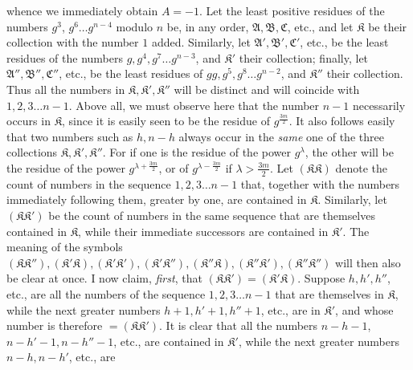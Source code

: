 whence we immediately obtain \(A=-1\). Let the least positive residues of the numbers \(g^3\), \(g^6\ldots g^{n-4}\) modulo \(n\) be, in any order, \(\mathfrak A,\allowbreak \mathfrak B,\allowbreak \mathfrak C\), etc., and let \(\mathfrak K\) be their collection with the number \(1\) added. Similarly, let \(\mathfrak A',\allowbreak \mathfrak B',\allowbreak \mathfrak C'\), etc., be the least residues of the numbers \(g,\allowbreak g^4,\allowbreak g^7\ldots g^{n-3}\), and \(\mathfrak K'\) their collection; finally, let \(\mathfrak A'',\allowbreak \mathfrak B'',\allowbreak \mathfrak C''\), etc., be the least residues of \(gg,\allowbreak g^5,\allowbreak g^8\ldots g^{n-2}\), and \(\mathfrak K''\) their collection. Thus all the numbers in \(\mathfrak K,\allowbreak \mathfrak K',\allowbreak \mathfrak K''\) will be distinct and will coincide with \(1,\allowbreak 2,\allowbreak 3\ldots n-1\). Above all, we must observe here that the number \(n-1\) necessarily occurs in \(\mathfrak K\), since it is easily seen to be the residue of \(g^{\frac{3m}{2}}\). It also follows easily that two numbers such as \(h,\allowbreak n-h\) always occur in the \textit{same} one of the three collections \(\mathfrak K,\allowbreak \mathfrak K',\allowbreak \mathfrak K''\). For if one is the residue of the power \(g^\lambda\), the other will be the residue of the power \(g^{\lambda+\frac{3m}{2}}\), or of \(g^{\lambda-\frac{3m}{2}}\) if \(\lambda>\frac{3m}{2}\). Let \((\mathfrak K\mathfrak K)\) denote the count of numbers in the sequence \(1,\allowbreak 2,\allowbreak 3\ldots n-1\) that, together with the numbers immediately following them, greater by one, are contained in \(\mathfrak K\). Similarly, let \((\mathfrak K\mathfrak K')\) be the count of numbers in the same sequence that are themselves contained in \(\mathfrak K\), while their immediate successors are contained in \(\mathfrak K'\). The meaning of the symbols \((\mathfrak K\mathfrak K''),\allowbreak (\mathfrak K'\mathfrak K),\allowbreak (\mathfrak K'\mathfrak K'),\allowbreak (\mathfrak K'\mathfrak K''),\allowbreak (\mathfrak K''\mathfrak K),\allowbreak (\mathfrak K''\mathfrak K'),\allowbreak (\mathfrak K''\mathfrak K'')\) will then also be clear at once. I now claim, \textit{first}, that \((\mathfrak K\mathfrak K')=(\mathfrak K'\mathfrak K)\). Suppose \(h,\allowbreak h',\allowbreak h''\), etc., are all the numbers of the sequence \(1,\allowbreak 2,\allowbreak 3\ldots n-1\) that are themselves in \(\mathfrak K\), while the next greater numbers \(h+1,\allowbreak h'+1,\allowbreak h''+1\), etc., are in \(\mathfrak K'\), and whose number is therefore \(=(\mathfrak K\mathfrak K')\). It is clear that all the numbers \(n-h-1\), \(n-h'-1,\allowbreak n-h''-1\), etc., are contained in \(\mathfrak K'\), while the next greater numbers \(n-h,\allowbreak n-h'\), etc., are
